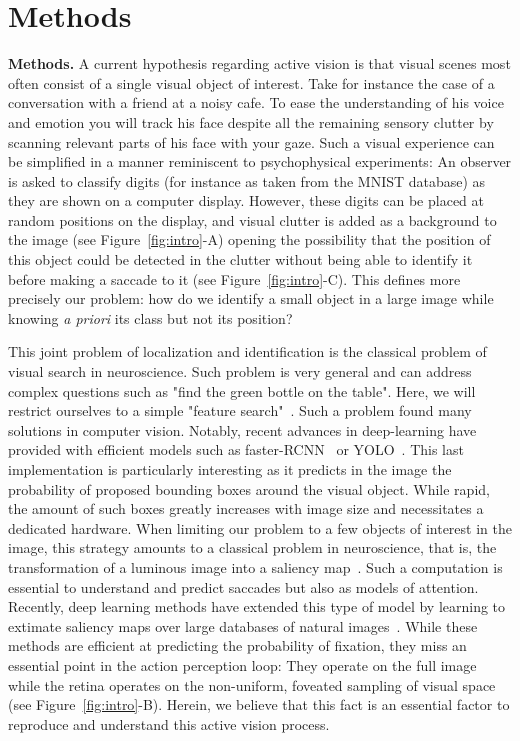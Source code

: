 \CNS
\section{Methods}
\else
\textbf{Methods. }
\fi
A current hypothesis regarding active vision is that visual scenes most often consist of a single visual object of interest. Take for instance the case of a conversation with a friend at a noisy cafe. To ease the understanding of his voice and emotion you will track his face despite all the remaining sensory clutter by scanning relevant parts of his face with your gaze. Such a visual experience can be simplified in a manner reminiscent to psychophysical experiments: An observer is asked to classify digits (for instance as taken from the MNIST database) as they are shown on a computer display. However, these digits can be placed at random positions on the display, and visual clutter is added as a background to the image (see Figure~\ref{fig:intro}-A) opening the possibility that the position of this object could be detected in the clutter without being able to identify it before making a saccade to it (see Figure~\ref{fig:intro}-C). This defines more precisely our problem: how do we identify a small object in a large image while knowing \emph{a priori} its class but not its position?



\CNS
This joint problem of localization and identification is the classical problem of visual search in neuroscience. Such problem is very general and can address complex questions such as "find the green bottle on the table". Here, we will restrict ourselves to a simple "feature search"~\citep{Treisman80}. Such a problem found many solutions in computer vision. Notably, recent advances in deep-learning have provided with efficient models such as faster-RCNN~\citep{Ren17} or YOLO~\citep{Redmon15}. This last implementation is particularly interesting as it predicts in the image the probability of proposed bounding boxes around the visual object. While rapid, the amount of such boxes greatly increases with image size and necessitates a dedicated hardware. When limiting our problem to a few objects of interest in the image, this strategy amounts to a classical problem in neuroscience, that is, the transformation of a luminous image into a saliency map~\citep{Itti01}. Such a computation is essential to understand and predict saccades but also as models of attention. Recently, deep learning methods have extended this type of model by learning to extimate saliency maps over large databases of natural images~\citep{Kummerer16}. While these methods are efficient at predicting the probability of fixation, they miss an essential point in the action perception loop: They operate on the full image while the retina operates on the non-uniform, foveated sampling of visual space (see Figure~\ref{fig:intro}-B). Herein, we believe that this fact is an essential factor to reproduce and understand this active vision process.

